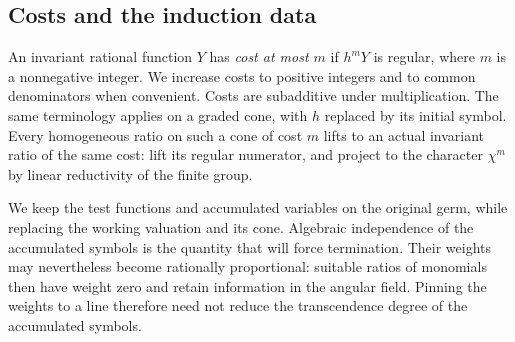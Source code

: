 \subsection{Costs and the induction data}

An invariant rational function $Y$ has \emph{cost at most $m$} if
$h^mY$ is regular, where $m$ is a nonnegative integer.  We increase costs
to positive integers and to common denominators when convenient.  Costs
are subadditive under multiplication.  The same terminology applies on
a graded cone, with $h$ replaced by its initial symbol.  Every homogeneous
ratio on such a cone of cost $m$ lifts to an actual invariant ratio of the
same cost: lift its regular numerator, and project to the character
$\chi^m$ by linear reductivity of the finite group.

We keep the test functions and accumulated variables on the original germ,
while replacing the working valuation and its cone.  Algebraic independence
of the accumulated symbols is the quantity that will force termination.
Their weights may nevertheless become rationally proportional: suitable
ratios of monomials then have weight zero and retain information in the
angular field.  Pinning the weights to a line therefore need not reduce
the transcendence degree of the accumulated symbols.

